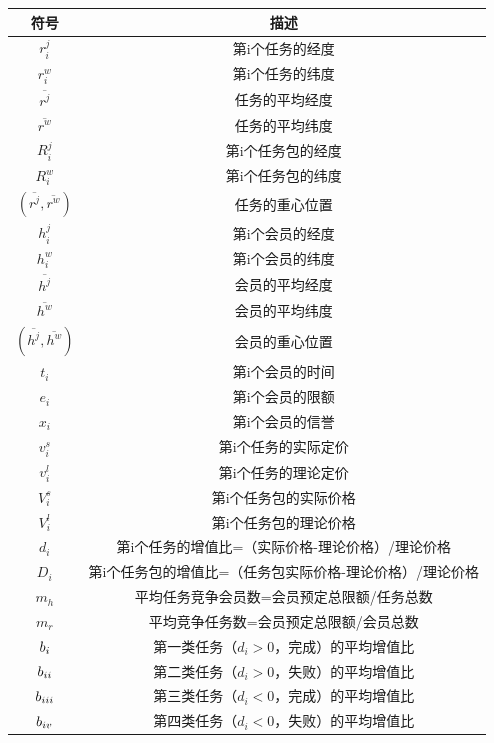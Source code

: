 \documentclass{ctexart}
\begin{document}
\begin{table}[h]\centering\footnotesize
\begin{tabular}{c c }
\bottomrule[1pt] 
 符号&描述\\

\hline
$r^{j}_{i}$&第i个任务的经度\\
$r^{w}_{i}$&第i个任务的纬度\\
$\overline{r^{j}}$&任务的平均经度\\
$\overline{r^{w}}$&任务的平均纬度\\
$R^{j}_{i}$	&第i个任务包的经度\\
$R^{w}_{i}$&第i个任务包的纬度\\
$(\overline{r^{j}},\overline{r^{w}})$&任务的重心位置\\
$h^{j}_{i}$&第i个会员的经度\\
$h^{w}_{i}$&第i个会员的纬度\\
$\overline{h^{j}}$&会员的平均经度\\
$\overline{h^{w}}$&会员的平均纬度\\
$(\overline{h^{j}},\overline{h^{w}})$&会员的重心位置\\
$t_{i}$&第i个会员的时间\\
$e_{i}$&第i个会员的限额\\
$x_{i}$&第i个会员的信誉\\
$v_{i}^{s}$&第i个任务的实际定价\\
$v_{i}^{l}$&第i个任务的理论定价\\
$V^{s}_{i}$	&第i个任务包的实际价格\\
$V^{l}_{i}$	&第i个任务包的理论价格\\
$d_{i}$&第i个任务的增值比=（实际价格-理论价格）/理论价格\\
$D_{i}$&	第i个任务包的增值比=（任务包实际价格-理论价格）/理论价格\\
$m_{h}$&平均任务竞争会员数=会员预定总限额/任务总数\\
$m_{r}$&平均竞争任务数=会员预定总限额/会员总数\\
$b_{\uppercase\expandafter{\romannumeral1}}$&第一类任务（$d_{i}>0$，完成）的平均增值比\\
$b_{\uppercase\expandafter{\romannumeral2}}$&第二类任务（$d_{i}>0$，失败）的平均增值比\\
$b_{\uppercase\expandafter{\romannumeral3}}$&第三类任务（$d_{i}<0$，完成）的平均增值比\\
$b_{\uppercase\expandafter{\romannumeral4}}$&第四类任务（$d_{i}<0$，失败）的平均增值比\\
\bottomrule[1pt] 
\end{tabular}
\end{table}
\end{document}
